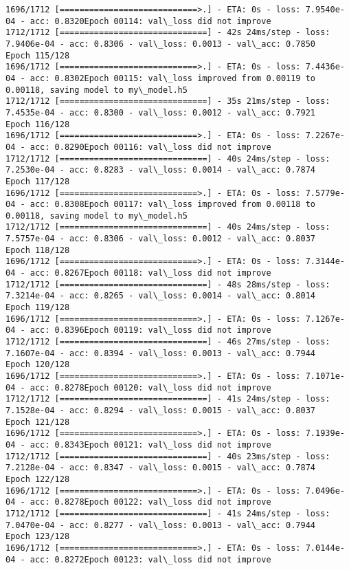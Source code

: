 \documentclass[11pt]{article}
\begin{document}
\begin{Verbatim}[commandchars=\\\{\}]
1696/1712 [============================>.] - ETA: 0s - loss: 7.9540e-04 - acc: 0.8320Epoch 00114: val\_loss did not improve
1712/1712 [==============================] - 42s 24ms/step - loss: 7.9406e-04 - acc: 0.8306 - val\_loss: 0.0013 - val\_acc: 0.7850
Epoch 115/128
1696/1712 [============================>.] - ETA: 0s - loss: 7.4436e-04 - acc: 0.8302Epoch 00115: val\_loss improved from 0.00119 to 0.00118, saving model to my\_model.h5
1712/1712 [==============================] - 35s 21ms/step - loss: 7.4535e-04 - acc: 0.8300 - val\_loss: 0.0012 - val\_acc: 0.7921
Epoch 116/128
1696/1712 [============================>.] - ETA: 0s - loss: 7.2267e-04 - acc: 0.8290Epoch 00116: val\_loss did not improve
1712/1712 [==============================] - 40s 24ms/step - loss: 7.2530e-04 - acc: 0.8283 - val\_loss: 0.0014 - val\_acc: 0.7874
Epoch 117/128
1696/1712 [============================>.] - ETA: 0s - loss: 7.5779e-04 - acc: 0.8308Epoch 00117: val\_loss improved from 0.00118 to 0.00118, saving model to my\_model.h5
1712/1712 [==============================] - 40s 24ms/step - loss: 7.5757e-04 - acc: 0.8306 - val\_loss: 0.0012 - val\_acc: 0.8037
Epoch 118/128
1696/1712 [============================>.] - ETA: 0s - loss: 7.3144e-04 - acc: 0.8267Epoch 00118: val\_loss did not improve
1712/1712 [==============================] - 48s 28ms/step - loss: 7.3214e-04 - acc: 0.8265 - val\_loss: 0.0014 - val\_acc: 0.8014
Epoch 119/128
1696/1712 [============================>.] - ETA: 0s - loss: 7.1267e-04 - acc: 0.8396Epoch 00119: val\_loss did not improve
1712/1712 [==============================] - 46s 27ms/step - loss: 7.1607e-04 - acc: 0.8394 - val\_loss: 0.0013 - val\_acc: 0.7944
Epoch 120/128
1696/1712 [============================>.] - ETA: 0s - loss: 7.1071e-04 - acc: 0.8278Epoch 00120: val\_loss did not improve
1712/1712 [==============================] - 41s 24ms/step - loss: 7.1528e-04 - acc: 0.8294 - val\_loss: 0.0015 - val\_acc: 0.8037
Epoch 121/128
1696/1712 [============================>.] - ETA: 0s - loss: 7.1939e-04 - acc: 0.8343Epoch 00121: val\_loss did not improve
1712/1712 [==============================] - 40s 23ms/step - loss: 7.2128e-04 - acc: 0.8347 - val\_loss: 0.0015 - val\_acc: 0.7874
Epoch 122/128
1696/1712 [============================>.] - ETA: 0s - loss: 7.0496e-04 - acc: 0.8278Epoch 00122: val\_loss did not improve
1712/1712 [==============================] - 41s 24ms/step - loss: 7.0470e-04 - acc: 0.8277 - val\_loss: 0.0013 - val\_acc: 0.7944
Epoch 123/128
1696/1712 [============================>.] - ETA: 0s - loss: 7.0144e-04 - acc: 0.8272Epoch 00123: val\_loss did not improve

\end{Verbatim}
\end{document}
